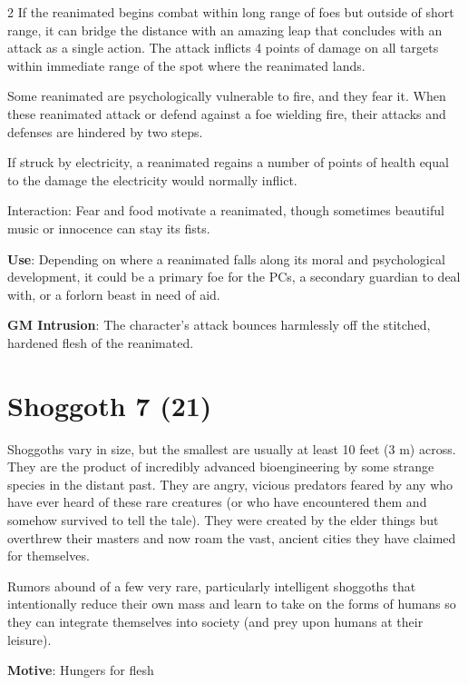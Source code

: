 \begin{multicols}{2}
If the reanimated begins combat within long range of foes but outside of short range, it can bridge the distance with an amazing leap that concludes with an attack as a single action. The attack inflicts 4 points of damage on all targets within immediate range of the spot where the reanimated lands.

Some reanimated are psychologically vulnerable to fire, and they fear it. When these reanimated attack or defend against a foe wielding fire, their attacks and defenses are hindered by two steps.

If struck by electricity, a reanimated regains a number of points of health equal to the damage the electricity would normally inflict.

Interaction: Fear and food motivate a reanimated, though sometimes beautiful music or innocence can stay its fists.

\textbf{Use}: Depending on where a reanimated falls along its moral and psychological development, it could be a primary foe for the PCs, a secondary guardian to deal with, or a forlorn beast in need of aid.

\textbf{GM Intrusion}: The character’s attack bounces harmlessly off the stitched, hardened flesh of the reanimated. 

\section{Shoggoth 7 (21)}

Shoggoths vary in size, but the smallest are usually at least 10 feet (3 m) across. They are the product of incredibly advanced bioengineering by some strange species in the distant past. They are angry, vicious predators feared by any who have ever heard of these rare creatures (or who have encountered them and somehow survived to tell the tale). They were created by the elder things but overthrew their masters and now roam the vast, ancient cities they have claimed for themselves.

Rumors abound of a few very rare, particularly intelligent shoggoths that intentionally reduce their own mass and learn to take on the forms of humans so they can integrate themselves into society (and prey upon humans at their leisure).

\textbf{Motive}: Hungers for flesh 


\end{multicols}
